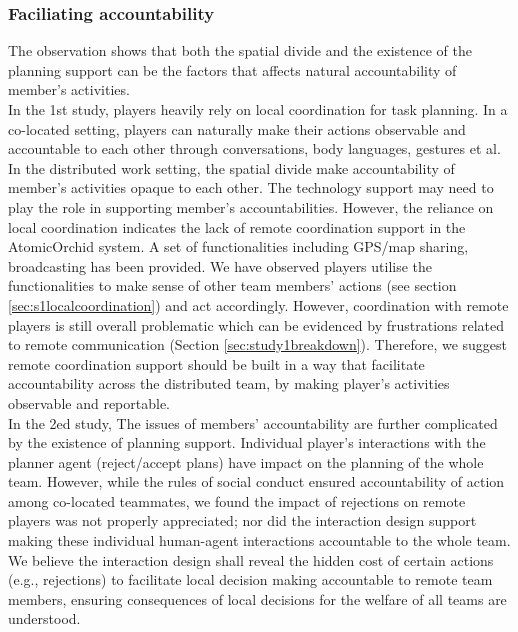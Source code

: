 \subsubsection{Faciliating accountability}\label{sec:conclusionAC}
The observation shows that both the spatial divide and the existence of the planning support can be the factors that affects natural accountability of member's activities. \\

In the 1st study, players heavily rely on local coordination for task planning. In a co-located setting, players can naturally make their actions observable and accountable to each other through conversations, body languages, gestures et al. In the distributed work setting, the spatial divide make accountability of member's activities opaque to each other. The technology support may need to play the role in supporting member's accountabilities. However, the reliance on local coordination indicates the lack of remote coordination support in the AtomicOrchid system. A set of functionalities including GPS/map sharing, broadcasting has been provided. We have observed players utilise the functionalities to make sense of other team members' actions (see section \ref{sec:s1localcoordination}) and act accordingly. However, coordination with remote players is still overall problematic which can be evidenced by frustrations related to remote communication (Section \ref{sec:study1breakdown}). Therefore, we suggest remote coordination support should be built in a way that facilitate accountability across the distributed team, by making player's activities observable and reportable.\\

In the 2ed study, The issues of members' accountability are further complicated by the existence of planning support. Individual player's interactions with the planner agent (reject/accept plans) have impact on the planning of the whole team. However, while the rules of social conduct ensured accountability of action among co-located teammates, we found the impact of rejections on remote players was not properly appreciated; nor did the interaction design support making these individual human-agent interactions accountable to the whole team. We believe the interaction design shall reveal the hidden cost of certain actions (e.g., rejections) to facilitate local decision making accountable to remote team members, ensuring consequences of local decisions for the welfare of all teams are understood. \\


